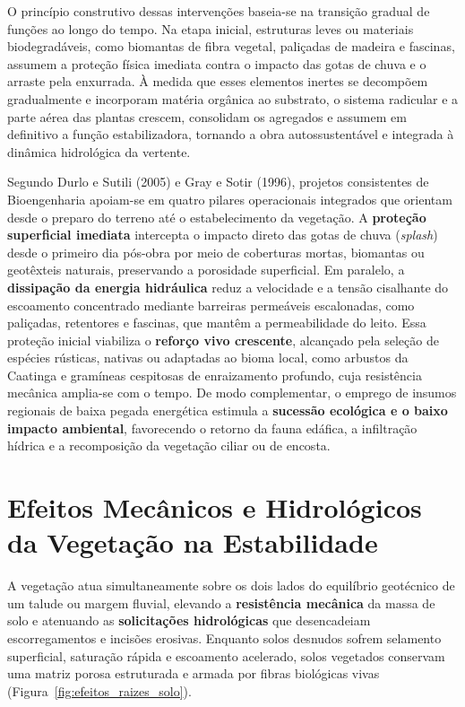 O princípio construtivo dessas intervenções baseia-se na transição gradual de funções ao longo do tempo. Na etapa inicial, estruturas leves ou materiais biodegradáveis, como biomantas de fibra vegetal, paliçadas de madeira e fascinas, assumem a proteção física imediata contra o impacto das gotas de chuva e o arraste pela enxurrada. À medida que esses elementos inertes se decompõem gradualmente e incorporam matéria orgânica ao substrato, o sistema radicular e a parte aérea das plantas crescem, consolidam os agregados e assumem em definitivo a função estabilizadora, tornando a obra autossustentável e integrada à dinâmica hidrológica da vertente.

Segundo Durlo e Sutili (2005) e Gray e Sotir (1996), projetos consistentes de Bioengenharia apoiam-se em quatro pilares operacionais integrados que orientam desde o preparo do terreno até o estabelecimento da vegetação. A \textbf{proteção superficial imediata} intercepta o impacto direto das gotas de chuva (\textit{splash}) desde o primeiro dia pós-obra por meio de coberturas mortas, biomantas ou geotêxteis naturais, preservando a porosidade superficial. Em paralelo, a \textbf{dissipação da energia hidráulica} reduz a velocidade e a tensão cisalhante do escoamento concentrado mediante barreiras permeáveis escalonadas, como paliçadas, retentores e fascinas, que mantêm a permeabilidade do leito. Essa proteção inicial viabiliza o \textbf{reforço vivo crescente}, alcançado pela seleção de espécies rústicas, nativas ou adaptadas ao bioma local, como arbustos da Caatinga e gramíneas cespitosas de enraizamento profundo, cuja resistência mecânica amplia-se com o tempo. De modo complementar, o emprego de insumos regionais de baixa pegada energética estimula a \textbf{sucessão ecológica e o baixo impacto ambiental}, favorecendo o retorno da fauna edáfica, a infiltração hídrica e a recomposição da vegetação ciliar ou de encosta.

\section{Efeitos Mecânicos e Hidrológicos da Vegetação na Estabilidade}

A vegetação atua simultaneamente sobre os dois lados do equilíbrio geotécnico de um talude ou margem fluvial, elevando a \textbf{resistência mecânica} da massa de solo e atenuando as \textbf{solicitações hidrológicas} que desencadeiam escorregamentos e incisões erosivas. Enquanto solos desnudos sofrem selamento superficial, saturação rápida e escoamento acelerado, solos vegetados conservam uma matriz porosa estruturada e armada por fibras biológicas vivas (Figura~\ref{fig:efeitos_raizes_solo}).

